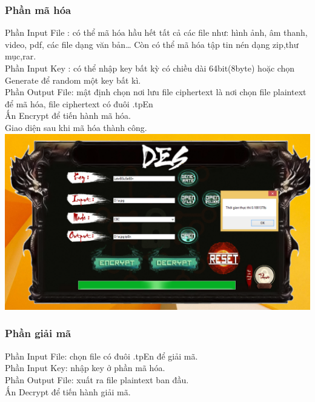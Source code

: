 \documentclass[paper=a4, fontsize=11pt]{scrartcl}	%
\numberwithin{equation}{section}															%
\numberwithin{figure}{section}																%
\numberwithin{table}{section}																%
\begin{document}
 		\subsubsection{Phần mã hóa}
 		
 	    Phần Input File : có thể mã hóa hầu hết tất cả các file như: hình ảnh, âm thanh, video, pdf, các file dạng văn bản… Còn có thể mã hóa tập tin nén dạng zip,thư mục,rar.\\
 	
 	
		Phần Input Key : có thể nhập key bất kỳ có chiều dài 64bit(8byte) hoặc chọn Generate để random một key bất kì.\\
		
		
		Phần Output File: mật định chọn nơi lưu file ciphertext là nơi chọn file plaintext để mã hóa, file ciphertext có đuôi .tpEn\\
	    
	
		Ấn Encrypt để tiến hành mã hóa.\\
		
		Giao diện sau khi mã hóa thành công.\\
		
		\includegraphics[scale=0.4]{DES_END}
 		\subsubsection{Phần giải mã}
 		
 		Phần Input File: chọn file có đuôi .tpEn để giải mã.\\
 	
 	
		Phần Input Key: nhập key ở phần mã hóa.\\
	
	
		Phần Output File: xuất ra file plaintext ban đầu.\\
	
	
		Ấn Decrypt để tiến hành giải mã.\\
		
\end{document}
